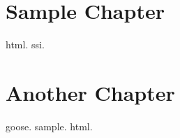 \documentclass{book}
\begin{document}
\chapter{Sample Chapter}
\gls{html}.
\gls{ssi}.

\chapter{Another Chapter}
\gls{goose}. \gls{sample}. \gls{html}.

\printunsrtglossaries
\end{document}
